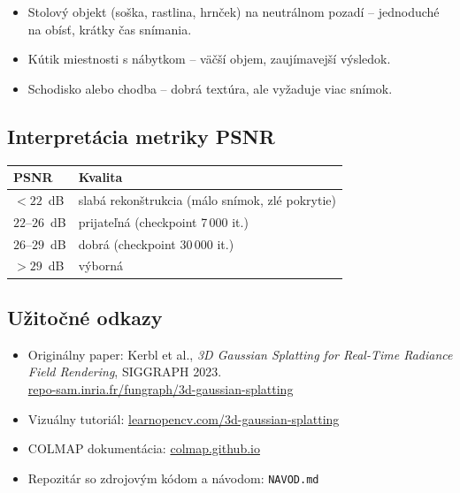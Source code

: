 \documentclass{article}
\begin{document}
\begin{itemize}
    \item Stolový objekt (soška, rastlina, hrnček) na neutrálnom pozadí –
          jednoduché na obísť, krátky čas snímania.
    \item Kútik miestnosti s nábytkom – väčší objem, zaujímavejší výsledok.
    \item Schodisko alebo chodba – dobrá textúra, ale vyžaduje viac snímok.
\end{itemize}

\subsection*{Interpretácia metriky PSNR}

\begin{center}
\begin{tabular}{ll}
\toprule
PSNR & Kvalita \\
\midrule
$< 22$~dB & slabá rekonštrukcia (málo snímok, zlé pokrytie) \\
$22$–$26$~dB & prijateľná (checkpoint 7\,000 it.) \\
$26$–$29$~dB & dobrá (checkpoint 30\,000 it.) \\
$> 29$~dB & výborná \\
\bottomrule
\end{tabular}
\end{center}

\subsection*{Užitočné odkazy}

\begin{itemize}
    \item Originálny paper: Kerbl et al., \textit{3D Gaussian Splatting for
          Real-Time Radiance Field Rendering}, SIGGRAPH 2023.\\
          \href{https://repo-sam.inria.fr/fungraph/3d-gaussian-splatting/}{repo-sam.inria.fr/fungraph/3d-gaussian-splatting}
    \item Vizuálny tutoriál:
          \href{https://learnopencv.com/3d-gaussian-splatting/}{learnopencv.com/3d-gaussian-splatting}
    \item COLMAP dokumentácia:
          \href{https://colmap.github.io/}{colmap.github.io}
    \item Repozitár so zdrojovým kódom a návodom: \texttt{NAVOD.md}
\end{itemize}
\end{document}
